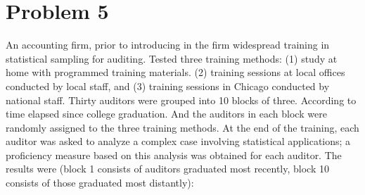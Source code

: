 \documentclass{article}
\begin{document}
\section{Problem 5}
An accounting firm, prior to introducing in the firm widespread training in statistical sampling for
auditing. Tested three training methods: (1) study at home with programmed training materials.
(2) training sessions at local offices conducted by local staff, and (3) training sessions in Chicago
conducted by national staff. Thirty auditors were grouped into 10 blocks of three. According to
time elapsed since college graduation. And the auditors in each block were randomly assigned to the
three training methods. At the end of the training, each auditor was asked to analyze a complex
case involving statistical applications; a proficiency measure based on this analysis was obtained
for each auditor. The results were (block 1 consists of auditors graduated most recently, block 10
consists of those graduated most distantly):
\end{document}
